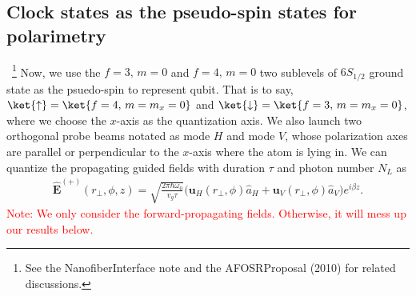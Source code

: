 \subsection{Clock states as the pseudo-spin states for polarimetry}~\footnote{See the NanofiberInterface note and the AFOSRProposal (2010) for related discussions.}
Now, we use the $ f=3,\,m=0 $ and $ f=4,\,m=0 $ two sublevels of $ 6S_{1/2} $ ground state as the psuedo-spin to represent qubit. That is to say, $ \ket{\uparrow}=\ket{f=4,\,m=m_x=0} $ and $ \ket{\downarrow}=\ket{f=3,\,m=m_x=0} $, where we choose the $ x $-axis as the quantization axis. We also launch two orthogonal probe beams notated as mode $ H $ and mode $ V $, whose polarization axes are parallel or perpendicular to the $ x $-axis where the atom is lying in. We can quantize the propagating guided fields with duration $ \tau $ and photon number $ N_L $ as
\begin{align} \label{Eq::FiberModeFunctions}
		\hat{\mathbf{E}}^{(+)}(r\!_\perp,\phi,z) = \sqrt{ \frac{2 \pi \hbar \omega_0}{ v_g \tau} } \big( \mathbf{u}_H(r\!_\perp,\phi) \hat{a}_H + \mathbf{u}_V(r\!_\perp,\phi) \hat{a}_V \big) e^{i \beta z}.
\end{align}
\textcolor{red}{Note: We only consider the forward-propagating fields. Otherwise, it will mess up our results below.}

